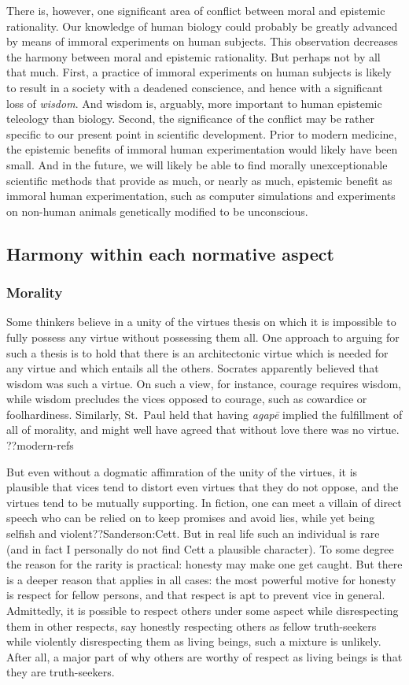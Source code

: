 There is, however, one significant area of conflict between moral and epistemic rationality. Our knowledge of human 
biology could probably be greatly advanced by means of immoral experiments on human subjects. This observation decreases
the harmony between moral and epistemic rationality. But perhaps not by all that much. First, a practice of immoral 
experiments on human subjects is likely to result in a society with a deadened conscience, and hence with a significant
loss of \textit{wisdom}. And wisdom is, arguably, more important to human epistemic teleology than biology. Second,
the significance of the conflict may be rather specific to our present point in scientific development. Prior to 
modern medicine, the epistemic benefits of immoral human experimentation would likely have been small. And in the 
future, we will likely be able to find morally unexceptionable scientific methods that provide as much, or nearly as much, epistemic
benefit as immoral human experimentation, such as computer simulations and experiments on non-human animals genetically 
modified to be unconscious.

\subsection{Harmony within each normative aspect}
\subsubsection{Morality}
Some thinkers believe in a unity of the virtues thesis on which it is impossible to fully possess any virtue 
without possessing them all. One approach to arguing for such a thesis is to hold that there is an architectonic 
virtue which is needed for any virtue and which entails all the others. Socrates apparently believed that wisdom 
was such a virtue. On such a view, for instance, courage requires wisdom, while wisdom precludes the vices opposed 
to courage, such as cowardice or foolhardiness. Similarly, St.~Paul held that having \textit{agap\={e}} implied the 
fulfillment of all of morality, and might well have agreed that without love there was no virtue. ??modern-refs

But even without a dogmatic affimration of the unity of the virtues, it is plausible that vices tend to distort even 
virtues that they do not oppose, and the virtues tend to be mutually supporting. In fiction, one can meet a villain 
of direct speech who can be relied on to keep promises and avoid lies, while yet being selfish and violent??Sanderson:Cett. 
But in real life such an individual is rare (and in fact I personally do not find Cett a plausible character). To some degree 
the reason for the rarity is practical: honesty may make 
one get caught. But there is a deeper reason that applies in all cases: the most powerful motive for honesty is respect 
for fellow persons, and that respect is apt to prevent vice in general. Admittedly, it is possible to respect others 
under some aspect while disrespecting them in other respects, say honestly respecting others as fellow truth-seekers 
while violently disrespecting them as living beings, such a mixture is unlikely. After all, a major part of why others 
are worthy of respect as living beings is that they are truth-seekers.

